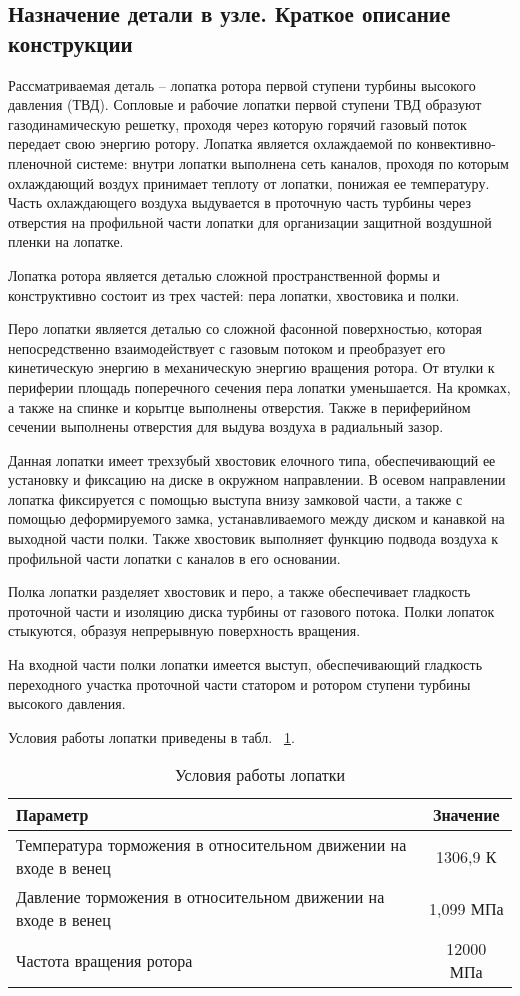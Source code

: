 \subsection{Назначение детали в узле. Краткое описание конструкции}
Рассматриваемая деталь – лопатка ротора первой ступени турбины высокого давления (ТВД). Сопловые и рабочие лопатки первой
ступени ТВД образуют газодинамическую решетку, проходя через которую горячий газовый поток передает свою энергию ротору.
Лопатка является охлаждаемой по конвективно-пленочной системе: внутри лопатки выполнена сеть каналов, проходя по которым
охлаждающий воздух принимает теплоту от лопатки, понижая ее температуру. Часть охлаждающего воздуха выдувается в проточную
часть турбины через отверстия на профильной части лопатки для организации защитной воздушной пленки на лопатке.

Лопатка ротора является деталью сложной пространственной формы и конструктивно состоит из трех частей: пера лопатки, хвостовика и полки.

Перо лопатки является деталью со сложной фасонной поверхностью, которая непосредственно взаимодействует с газовым потоком
и преобразует его кинетическую энергию в механическую энергию вращения ротора. От втулки к периферии площадь поперечного
сечения пера лопатки уменьшается. На кромках, а также на спинке и корытце выполнены отверстия. Также в периферийном сечении
выполнены отверстия для выдува воздуха в радиальный зазор.

Данная лопатки имеет трехзубый хвостовик елочного типа, обеспечивающий ее установку и фиксацию на диске в окружном направлении.
В осевом направлении лопатка фиксируется с помощью выступа внизу замковой части, а также с помощью деформируемого замка,
устанавливаемого между диском и канавкой на выходной части полки. Также хвостовик выполняет функцию подвода воздуха к
профильной части лопатки с каналов в его основании.

Полка лопатки разделяет хвостовик и перо, а также обеспечивает гладкость проточной части и изоляцию диска турбины от газового
потока. Полки лопаток стыкуются, образуя непрерывную поверхность вращения.

На входной части полки лопатки имеется выступ, обеспечивающий гладкость переходного участка проточной части статором и
ротором ступени турбины высокого давления.

Условия работы лопатки приведены в табл. ~\ref{tab:technology-env-parameters}.
\begin{longtable}{|p{12cm}|c|}
	\caption{Условия работы лопатки} \label{tab:technology-env-parameters}
	\hline
	\textbf{Параметр} & \textbf{Значение} \\ \hline
	\endhead
	Температура торможения в относительном движении на входе в венец & 1306,9 К \\ \hline
	Давление торможения в относительном движении на входе в венец & 1,099 МПа \\ \hline
	Частота вращения ротора & 12000 МПа \\ \hline
\end{longtable}

